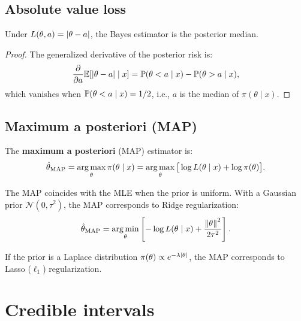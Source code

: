 \subsection{Absolute value loss}

\begin{theorem}
Under $L(\theta, a) = \left| \theta - a \right|$, the Bayes estimator is the
posterior median.
\end{theorem}

\begin{proof}
The generalized derivative of the posterior risk is:
\[
  \frac{\partial}{\partial a} \mathbb{E}[\left| \theta - a \right| \mid x]
  = \mathbb{P}(\theta < a \mid x) - \mathbb{P}(\theta > a \mid x),
\]
which vanishes when $\mathbb{P}(\theta < a \mid x) = 1/2$, i.e., $a$ is the
median of $\pi(\theta \mid x)$.
\end{proof}

\subsection{Maximum a posteriori (MAP)}

\begin{definition}
The \textbf{maximum a posteriori} (MAP) estimator is:
\[
  \hat{\theta}_{\text{MAP}} = \operatorname*{arg\,max}_\theta \pi(\theta \mid x)
  = \operatorname*{arg\,max}_\theta \big[\log L(\theta \mid x) + \log \pi(\theta)\big].
\]
\end{definition}

\begin{remark}
The MAP coincides with the MLE when the prior is uniform. With a
Gaussian prior $\mathcal{N}(0, \tau^2)$, the MAP corresponds to Ridge
regularization:
\[
  \hat{\theta}_{\text{MAP}} = \operatorname*{arg\,min}_\theta \left[
  -\log L(\theta \mid x) + \frac{\left\| \theta \right\|^2}{2\tau^2}\right].
\]
\end{remark}

\begin{proposition}
If the prior is a Laplace distribution
$\pi(\theta) \propto e^{-\lambda \left| \theta \right|}$, the MAP corresponds
to Lasso ($\ell_1$) regularization.
\end{proposition}

\section{Credible intervals}

